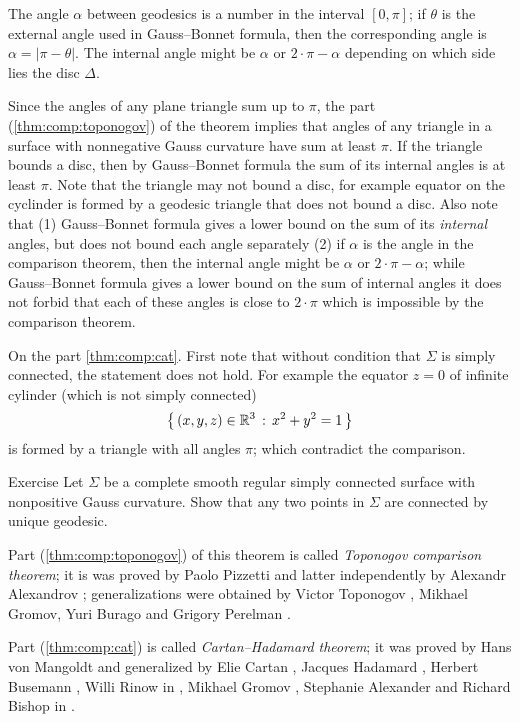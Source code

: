 The angle $\alpha$ between geodesics is a number in the interval $[0,\pi]$;
if $\theta$ is the external angle used in Gauss--Bonnet formula, then the corresponding angle is $\alpha=|\pi-\theta|$.
The internal angle might be $\alpha$ or $2\cdot\pi-\alpha$ depending on which side lies the disc $\Delta$.

Since the angles of any plane triangle sum up to $\pi$,
the part (\ref{thm:comp:toponogov}) of the theorem implies that angles of any triangle in a surface with nonnegative Gauss curvature have sum at least $\pi$.
If the triangle bounds a disc, then by Gauss--Bonnet formula the sum of its internal angles is at least $\pi$.
Note that the triangle may not bound a disc, for example equator on the cyclinder is formed by a geodesic triangle that does not bound a disc.
Also note that (1) Gauss--Bonnet formula gives a lower bound on the sum of its \emph{internal} angles, but does not bound each angle separately (2) if $\alpha$ is the angle in the comparison theorem, then the internal angle might be $\alpha$ or $2\cdot\pi-\alpha$; while Gauss--Bonnet formula gives a lower bound on the sum of internal angles it does not forbid that each of these angles is close to $2\cdot \pi$ which is impossible by the comparison theorem.

On the part \ref{thm:comp:cat}.
First note that without condition that $\Sigma$ is simply connected, the statement does not hold.
For example the equator $z=0$ of infinite cylinder (which is not simply connected)
\[\left\{\,{(x,y,z)\in\mathbb{R}^3}\,:\,{x^2+y^2=1}\,\right\}\]
is formed by a triangle with all angles $\pi$; which contradict the comparison.

\begin{thm}{Exercise}
Let $\Sigma$ be a complete smooth regular simply connected surface with nonpositive Gauss curvature.
Show that any two points in $\Sigma$ are connected by unique geodesic.
\end{thm}


Part (\ref{thm:comp:toponogov}) of this theorem is called \emph{Toponogov comparison theorem};
it is was proved by Paolo Pizzetti \cite{pizzetti} and latter independently by Alexandr Alexandrov \cite{alexandrov}; generalizations were obtained by  Victor Toponogov \cite{toponogov}, Mikhael Gromov, Yuri Burago and Grigory Perelman \cite{BGP}.

Part (\ref{thm:comp:cat}) is called \emph{Cartan--Hadamard theorem};
it was proved by 
Hans von Mangoldt \cite{mangoldt} and generalized by Elie Cartan \cite{cartan}, Jacques Hadamard \cite{hadamard},
Herbert Busemann \cite{busemann},
Willi Rinow in \cite{rinow},
Mikhael Gromov \cite[p.119]{gromov},
Stephanie Alexander and Richard Bishop in \cite{a-b:h-c}.

